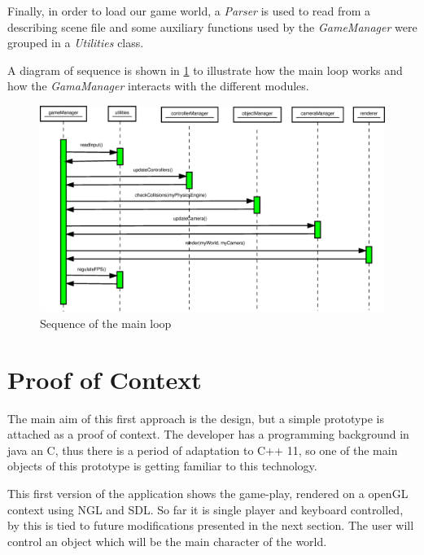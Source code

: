 \documentclass[]{article}
\begin{document}
Finally, in order to load our game world, a \emph{Parser} is used to read from a describing scene file and some auxiliary functions used by the \emph{GameManager} were grouped in a \emph{Utilities} class.

A diagram of sequence is shown in \ref{fig:mainLoop} to illustrate how the main loop works and how the \emph{GamaManager} interacts with the different modules.

\begin{figure}[h]
\begin{center}
\includegraphics[width=1\textwidth]{images/mainLoopSequence.eps}
\caption{Sequence of the main loop}
\label{fig:mainLoop}
\end{center}
\end{figure}


\section{Proof of Context}

The main aim of this first approach is the design, but a simple prototype is attached as a proof of context. The developer has a programming background in java an C, thus there is a period of adaptation to C++ 11, so one of the main objects of this prototype is getting familiar to this technology.

This first version of the application shows the game-play, rendered on a openGL context using NGL and SDL. So far it is single player and keyboard controlled, by this is tied to future modifications presented in the next section. The user will control an object which will be the main character of the world.
\end{document}
